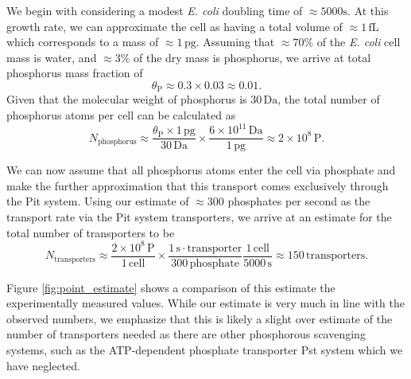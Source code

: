 \documentclass[letterpaper, 10pt]{article}
\begin{document}
We begin with considering a modest \textit{E. coli} doubling time of $\approx
5000 \text{s}$. At this growth rate, we can approximate the cell as having a
total volume of $\approx 1\, \text{fL}$ which corresponds to a mass of $\approx
1\, \text{pg}$. Assuming that $\approx 70\%$ of the \textit{E. coli} cell mass
is water, and $\approx 3\%$ of the dry mass is phosphorus, we arrive at total
phosphorus mass fraction of 
\begin{equation}
    \theta_\text{P} \approx 0.3 \times 0.03 \approx 0.01.
\end{equation}
Given that the molecular weight of
phosphorus is $30\,\text{Da}$, the total number of phosphorus atoms per cell can
be calculated as 
\begin{equation}
N_\text{phosphorus} \approx \frac{\theta_\text{P} \times 1\,\text{pg}}{30\,\text{Da}}\times \frac{6\times10^{11}\,\text{Da}}{1\,\text{pg}} \approx 2 \times 10^8\, \text{P}.
\end{equation}

We can now assume that all phosphorus atoms enter the cell via phosphate and
make the further approximation that this transport comes exclusively through the
Pit system. Using our estimate of $\approx 300$ phosphates per second as the
transport rate via the Pit system transporters, we arrive at an estimate for the
total number of transporters to be 
\begin{equation}
    N_\text{transporters} \approx \frac{2 \times 10^8\,\text{P}}{1\,\text{cell}}\times \frac{1\,\text{s}\cdot\text{transporter}}{300\,\text{phosphate}}\frac{1\,\text{cell}}{5000\,\text{s}}\approx 150\, \text{transporters}.
    \label{eq:point_estimate}
\end{equation}

Figure \ref{fig:point_estimate} shows a comparison of this estimate the
experimentally measured values. While our estimate is very much in line with
the observed numbers, we emphasize that this is likely a slight over estimate
of the number of transporters needed as there are other phosphorous
scavenging systems, such as the ATP-dependent phosphate transporter Pst
system which we have neglected.
\end{document}
